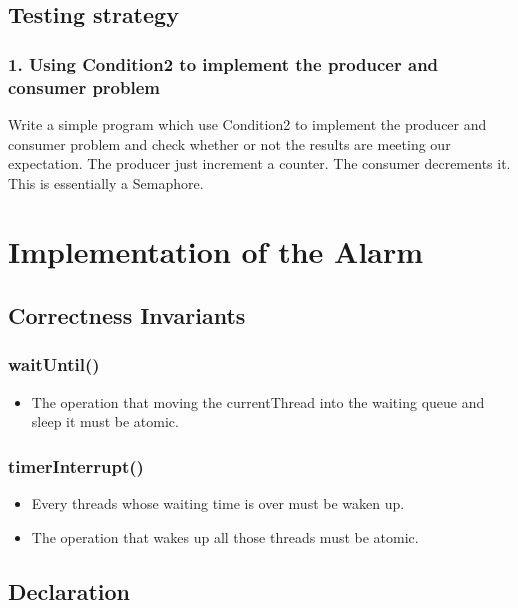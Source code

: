 \documentclass{article}
\begin{document}
	\subsection{Testing strategy}
	
	\subsubsection*{1. Using Condition2 to implement the producer and consumer problem}
	
	Write a simple program which use Condition2 to implement the producer and consumer problem and check whether or not the results are meeting our expectation.
	The producer just increment a counter. The consumer decrements it. This is essentially a Semaphore.
%	
	\section{Implementation of the Alarm}
	
	\subsection{Correctness Invariants}
	
	\subsubsection*{waitUntil()}
	\begin{itemize}
		\item The operation that moving the currentThread into the waiting queue and sleep it must be atomic.
	\end{itemize}
	
	\subsubsection*{timerInterrupt()}
	\begin{itemize}
		\item Every threads whose waiting time is over must be waken up.
		
		\item The operation that wakes up all those threads must be atomic.
	\end{itemize}
	
	\subsection{Declaration}
	
\end{document}
